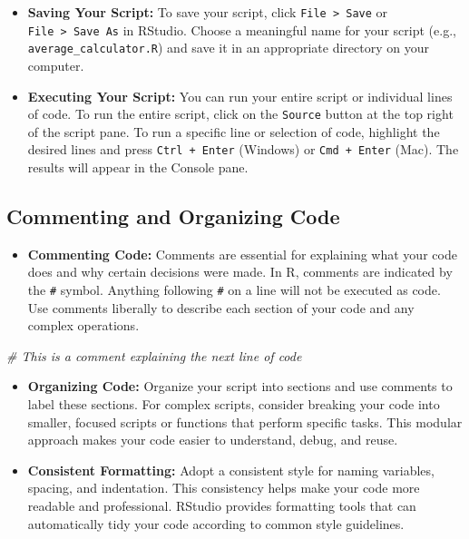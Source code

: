 \documentclass[
]{book}
\newenvironment{Shaded}{\begin{snugshade}}{\end{snugshade}}
\newcommand{\CommentTok}[1]{\textcolor[rgb]{0.56,0.35,0.01}{\textit{#1}}}
\providecommand{\tightlist}{%
  \setlength{\itemsep}{0pt}\setlength{\parskip}{0pt}}
\begin{document}
\begin{itemize}
\item
  \textbf{Saving Your Script:} To save your script, click \texttt{File\ \textgreater{}\ Save} or \texttt{File\ \textgreater{}\ Save\ As} in RStudio. Choose a meaningful name for your script (e.g., \texttt{average\_calculator.R}) and save it in an appropriate directory on your computer.
\item
  \textbf{Executing Your Script:} You can run your entire script or individual lines of code. To run the entire script, click on the \texttt{Source} button at the top right of the script pane. To run a specific line or selection of code, highlight the desired lines and press \texttt{Ctrl\ +\ Enter} (Windows) or \texttt{Cmd\ +\ Enter} (Mac). The results will appear in the Console pane.
\end{itemize}

\hypertarget{commenting-and-organizing-code}{%
\subsection*{Commenting and Organizing Code}\label{commenting-and-organizing-code}}

\begin{itemize}
\tightlist
\item
  \textbf{Commenting Code:} Comments are essential for explaining what your code does and why certain decisions were made. In R, comments are indicated by the \texttt{\#} symbol. Anything following \texttt{\#} on a line will not be executed as code. Use comments liberally to describe each section of your code and any complex operations.
\end{itemize}

\begin{Shaded}
\begin{Highlighting}[]
\CommentTok{\# This is a comment explaining the next line of code}
\end{Highlighting}
\end{Shaded}

\begin{itemize}
\item
  \textbf{Organizing Code:} Organize your script into sections and use comments to label these sections. For complex scripts, consider breaking your code into smaller, focused scripts or functions that perform specific tasks. This modular approach makes your code easier to understand, debug, and reuse.
\item
  \textbf{Consistent Formatting:} Adopt a consistent style for naming variables, spacing, and indentation. This consistency helps make your code more readable and professional. RStudio provides formatting tools that can automatically tidy your code according to common style guidelines.
\end{itemize}
\end{document}
